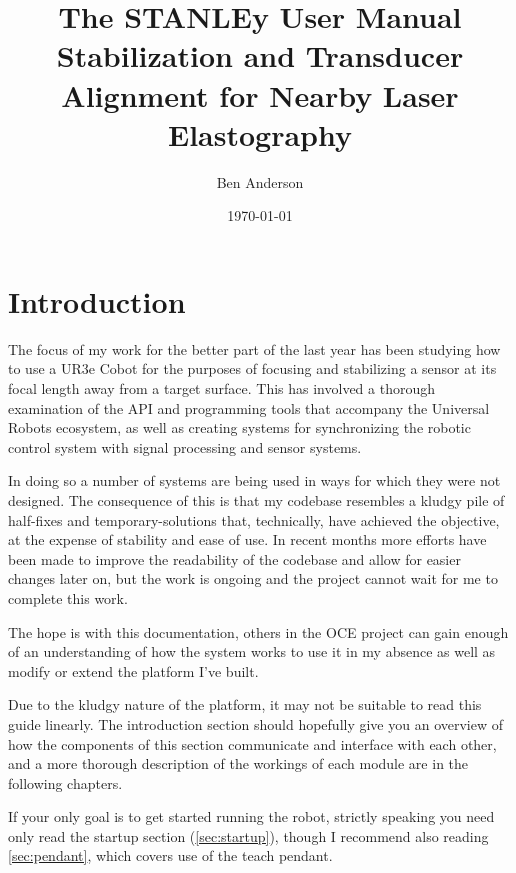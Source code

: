 \documentclass[11pt]{article}
\date{\today}
\author{Ben Anderson}
\title{The STANLEy User Manual \\[1ex] \large Stabilization and Transducer Alignment for Nearby Laser Elastography}
\begin{document}
\newcommand\connect[2]{\path[draw,arrow] (#1) |- ($(#1)!1/2!(#2)$) -| (#2)}

\maketitle
\tableofcontents
\parskip=6pt

\section{Introduction}\label{sec:intro}

The focus of my work for the better part of the last year has been studying how to use a UR3e Cobot for the purposes of focusing and stabilizing a sensor at its focal length away from a target surface. This has involved a thorough examination of the API and programming tools that accompany the Universal Robots ecosystem, as well as creating systems for synchronizing the robotic control system with signal processing and sensor systems.

In doing so a number of systems are being used in ways for which they were not designed. The consequence of this is that my codebase resembles a kludgy pile of half-fixes and temporary-solutions that, technically, have achieved the objective, at the expense of stability and ease of use.
In recent months more efforts have been made to improve the readability of the codebase and allow for easier changes later on, but the work is ongoing and the project cannot wait for me to complete this work.

The hope is with this documentation, others in the OCE project can gain enough of an understanding of how the system works to use it in my absence as well as modify or extend the platform I've built.

Due to the kludgy nature of the platform, it may not be suitable to read this guide linearly. The introduction section should hopefully give you an overview of how the components of this section communicate and interface with each other, and a more thorough description of the workings of each module are in the following chapters.

If your only goal is to get started running the robot, strictly speaking you need only read the startup section (\autoref{sec:startup}), though I recommend also reading \autoref{sec:pendant}, which covers use of the teach pendant.
\end{document}
